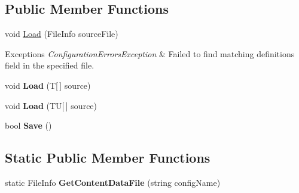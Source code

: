 \subsection*{Public Member Functions}
\begin{DoxyCompactItemize}
\item 
\hypertarget{class_s_e_mod_a_p_i_1_1_a_p_i_1_1_definitions_1_1_serializable_definitions_manager_afbac19457395374f58e02e90ae962897}{}void \hyperlink{class_s_e_mod_a_p_i_1_1_a_p_i_1_1_definitions_1_1_serializable_definitions_manager_afbac19457395374f58e02e90ae962897}{Load} (File\+Info source\+File)\label{class_s_e_mod_a_p_i_1_1_a_p_i_1_1_definitions_1_1_serializable_definitions_manager_afbac19457395374f58e02e90ae962897}

\begin{DoxyCompactList}\small\item\em 
\begin{DoxyExceptions}{Exceptions}
{\em Configuration\+Errors\+Exception} & Failed to find matching definitions field in the specified file.\\
\hline
\end{DoxyExceptions}
\end{DoxyCompactList}\item 
\hypertarget{class_s_e_mod_a_p_i_1_1_a_p_i_1_1_definitions_1_1_serializable_definitions_manager_afca07900e6d3ff59a1b62c791b00797c}{}void {\bfseries Load} (T\mbox{[}$\,$\mbox{]} source)\label{class_s_e_mod_a_p_i_1_1_a_p_i_1_1_definitions_1_1_serializable_definitions_manager_afca07900e6d3ff59a1b62c791b00797c}

\item 
\hypertarget{class_s_e_mod_a_p_i_1_1_a_p_i_1_1_definitions_1_1_serializable_definitions_manager_a3ed135895e922ddd4ac62364a0644a04}{}void {\bfseries Load} (T\+U\mbox{[}$\,$\mbox{]} source)\label{class_s_e_mod_a_p_i_1_1_a_p_i_1_1_definitions_1_1_serializable_definitions_manager_a3ed135895e922ddd4ac62364a0644a04}

\item 
\hypertarget{class_s_e_mod_a_p_i_1_1_a_p_i_1_1_definitions_1_1_serializable_definitions_manager_ac00ffcaba3e85582ae5895bd15870642}{}bool {\bfseries Save} ()\label{class_s_e_mod_a_p_i_1_1_a_p_i_1_1_definitions_1_1_serializable_definitions_manager_ac00ffcaba3e85582ae5895bd15870642}

\end{DoxyCompactItemize}
\subsection*{Static Public Member Functions}
\begin{DoxyCompactItemize}
\item 
\hypertarget{class_s_e_mod_a_p_i_1_1_a_p_i_1_1_definitions_1_1_serializable_definitions_manager_a72dc641356e12897e5b8e4346dc1775f}{}static File\+Info {\bfseries Get\+Content\+Data\+File} (string config\+Name)\label{class_s_e_mod_a_p_i_1_1_a_p_i_1_1_definitions_1_1_serializable_definitions_manager_a72dc641356e12897e5b8e4346dc1775f}

\end{DoxyCompactItemize}
